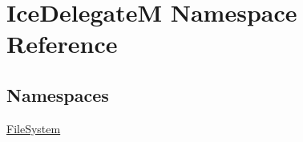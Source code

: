 \hypertarget{namespace_ice_delegate_m}{}\section{Ice\+Delegate\+M Namespace Reference}
\label{namespace_ice_delegate_m}
\subsection*{Namespaces}
\begin{DoxyCompactItemize}
\item 
 \hyperlink{namespace_ice_delegate_m_1_1_file_system}{File\+System}
\end{DoxyCompactItemize}

